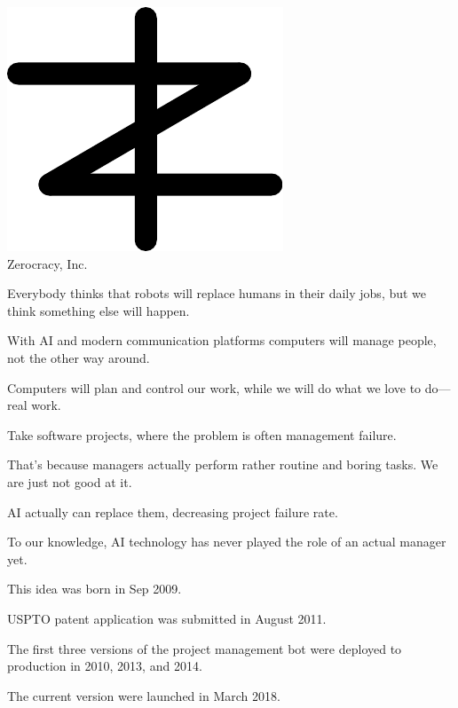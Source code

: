 \documentclass{article}
\begin{document}

\pagecolor{white}
\newcommand\slide[1]{%
  \pagebreak\topskip0pt\vspace*{\fill}%
  \begin{center}\Huge%
  #1
  \end{center}%
  \vspace*{\fill}%
}

\slide{\includegraphics[scale=1]{../images/zerocracy-logo.pdf}\\
Zerocracy, Inc.}

\slide{Everybody thinks that robots will replace humans in their daily jobs, but we think something else will happen.}

\slide{With AI and modern communication platforms computers will manage people, not the other way around.}

\slide{Computers will plan and control our work, while we will do what we love to do---real work.}

\slide{Take software projects, where the problem is often management failure.}

\slide{That’s because managers actually perform rather routine and boring tasks. We are just not good at it.}

\slide{AI actually can replace them, decreasing project failure rate.}

\slide{To our knowledge, AI technology has never played the role of an actual manager yet.}

\slide{This idea was born in Sep 2009.}

\slide{USPTO patent application was submitted in August 2011.\quad{\large US 12/703,202}}

\slide{The first three versions of the project management bot were deployed to production in 2010, 2013, and 2014.}

\slide{The current version were launched in March 2018.}
\end{document}
